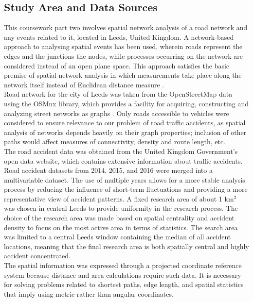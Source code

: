 \documentclass[acmsmall,nonacm,natbib=false]{acmart}
\begin{document}


\subsection{\large{Study Area and Data Sources}}
\leavevmode \par \noindent
This coursework part two involves spatial network analysis of a road network and any events related to it, located in Leeds, United Kingdom. A network-based approach to analysing spatial events has been used, wherein roads represent the edges and the junctions the nodes, while processes occurring on the network are considered instead of an open plane space. This approach satisfies the basic premise of spatial network analysis in which measurements take place along the network itself instead of Euclidean distance measure \cite{okabe2000spatial}.\\
Road network for the city of Leeds was taken from the OpenStreetMap data using the OSMnx library, which provides a facility for acquiring, constructing and analyzing street networks as graphs \cite{boeing2017osmnx}. Only roads accessible to vehicles were considered to ensure relevance to our problem of road traffic accidents, as spatial analysis of networks depends heavily on their graph properties; inclusion of other paths would affect measures of connectivity, density and route length, etc.\\
The road accident data was obtained from the United Kingdom Government’s open data website, which contains extensive information about traffic accidents. Road accident datasets from 2014, 2015, and 2016 were merged into a multivariable dataset. The use of multiple years allows for a more stable analysis process by reducing the influence of short-term fluctuations and providing a more representative view of accident patterns. A fixed research area of about 1 km$^2$ was chosen in central Leeds to provide uniformity in the research process. The choice of the research area was made based on spatial centrality and accident density to focus on the most active area in terms of statistics. The search area was limited to a central Leeds window containing the median of all accident locations, meaning that the final research area is both spatially central and highly accident concentrated.\\
The spatial information was expressed through a projected coordinate reference system because distance and area calculations require such data. It is necessary for solving problems related to shortest paths, edge length, and spatial statistics that imply using metric rather than angular coordinates.\\
\end{document}
